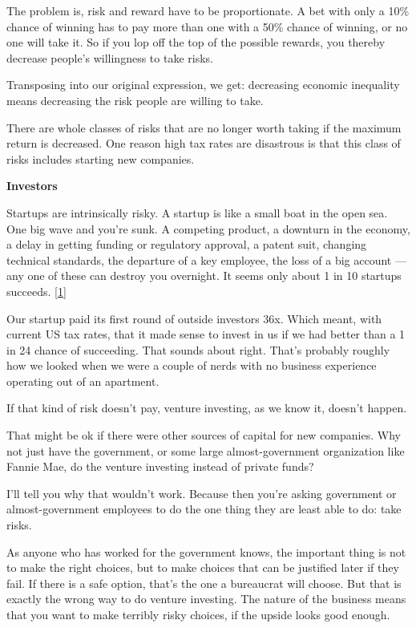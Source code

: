 The problem is, risk and reward have to be proportionate. A bet with
only a 10\% chance of winning has to pay more than one with a 50\%
chance of winning, or no one will take it. So if you lop off the top of
the possible rewards, you thereby decrease people's willingness to take
risks.

Transposing into our original expression, we get: decreasing economic
inequality means decreasing the risk people are willing to take.

There are whole classes of risks that are no longer worth taking if the
maximum return is decreased. One reason high tax rates are disastrous is
that this class of risks includes starting new companies.

\textbf{Investors}

Startups are intrinsically risky. A startup is like a small boat in the
open sea. One big wave and you're sunk. A competing product, a downturn
in the economy, a delay in getting funding or regulatory approval, a
patent suit, changing technical standards, the departure of a key
employee, the loss of a big account --- any one of these can destroy you
overnight. It seems only about 1 in 10 startups succeeds.
{[}\hyperref[f1n]{1}{]}

Our startup paid its first round of outside investors 36x. Which meant,
with current US tax rates, that it made sense to invest in us if we had
better than a 1 in 24 chance of succeeding. That sounds about right.
That's probably roughly how we looked when we were a couple of nerds
with no business experience operating out of an apartment.

If that kind of risk doesn't pay, venture investing, as we know it,
doesn't happen.

That might be ok if there were other sources of capital for new
companies. Why not just have the government, or some large
almost-government organization like Fannie Mae, do the venture investing
instead of private funds?

I'll tell you why that wouldn't work. Because then you're asking
government or almost-government employees to do the one thing they are
least able to do: take risks.

As anyone who has worked for the government knows, the important thing
is not to make the right choices, but to make choices that can be
justified later if they fail. If there is a safe option, that's the one
a bureaucrat will choose. But that is exactly the wrong way to do
venture investing. The nature of the business means that you want to
make terribly risky choices, if the upside looks good enough.

